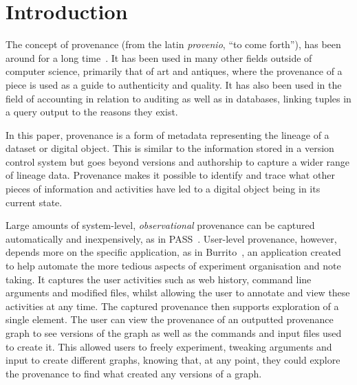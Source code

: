 \chapter{Introduction}


The concept of provenance (from the latin \textit{provenio}, ``to
come forth''), has been around for a long time~\cite{Bearman1985}.
It has been used in many other fields outside of computer science,
primarily that of art and antiques, where the provenance of a piece
is used as a guide to authenticity and quality. It has also been
used in the field of accounting in relation to auditing as well as
in databases, linking tuples in a query output to the reasons they
exist.

In this paper, provenance is a form of metadata representing the
lineage of a dataset or digital object. This is similar to the
information stored in a version control system but
goes beyond versions and authorship 
to capture a wider range of lineage data. 
Provenance makes it possible to identify and trace what other pieces
of information and activities have led to a digital object being in its
current state.

Large amounts of system-level, \textit{observational} provenance can be captured automatically and inexpensively, as in PASS~\cite{Macko2011,180755}. 
User-level provenance, however, depends more on the specific application,
as in Burrito~\cite{Guo2012}, an application created to help automate the more tedious aspects of experiment organisation and note taking. It captures the user activities such as web history, command line arguments and modified files, whilst allowing the user to annotate and view these activities at any time. The captured provenance then supports exploration of a single element. The user can view the provenance of an outputted provenance graph to see versions of the graph as well as the commands and input files used to create it. This allowed users to freely experiment, tweaking arguments and input to create different graphs, knowing that, at any point, they could explore the provenance to find what created any versions of a graph.

